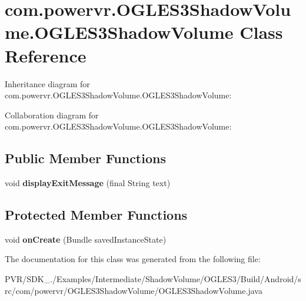\hypertarget{classcom_1_1powervr_1_1_o_g_l_e_s3_shadow_volume_1_1_o_g_l_e_s3_shadow_volume}{\section{com.\+powervr.\+O\+G\+L\+E\+S3\+Shadow\+Volume.\+O\+G\+L\+E\+S3\+Shadow\+Volume Class Reference}
\label{classcom_1_1powervr_1_1_o_g_l_e_s3_shadow_volume_1_1_o_g_l_e_s3_shadow_volume}
}


Inheritance diagram for com.\+powervr.\+O\+G\+L\+E\+S3\+Shadow\+Volume.\+O\+G\+L\+E\+S3\+Shadow\+Volume\+:


Collaboration diagram for com.\+powervr.\+O\+G\+L\+E\+S3\+Shadow\+Volume.\+O\+G\+L\+E\+S3\+Shadow\+Volume\+:
\subsection*{Public Member Functions}
\begin{DoxyCompactItemize}
\item 
\hypertarget{classcom_1_1powervr_1_1_o_g_l_e_s3_shadow_volume_1_1_o_g_l_e_s3_shadow_volume_a7284994bff8fd81f9d6a05ce71ef5eab}{void {\bfseries display\+Exit\+Message} (final String text)}\label{classcom_1_1powervr_1_1_o_g_l_e_s3_shadow_volume_1_1_o_g_l_e_s3_shadow_volume_a7284994bff8fd81f9d6a05ce71ef5eab}

\end{DoxyCompactItemize}
\subsection*{Protected Member Functions}
\begin{DoxyCompactItemize}
\item 
\hypertarget{classcom_1_1powervr_1_1_o_g_l_e_s3_shadow_volume_1_1_o_g_l_e_s3_shadow_volume_afda83d4de9f58fa8dbdd38a34e7bcec1}{void {\bfseries on\+Create} (Bundle saved\+Instance\+State)}\label{classcom_1_1powervr_1_1_o_g_l_e_s3_shadow_volume_1_1_o_g_l_e_s3_shadow_volume_afda83d4de9f58fa8dbdd38a34e7bcec1}

\end{DoxyCompactItemize}


The documentation for this class was generated from the following file\+:\begin{DoxyCompactItemize}
\item 
P\+V\+R/\+S\+D\+K\+\_./\+Examples/\+Intermediate/\+Shadow\+Volume/\+O\+G\+L\+E\+S3/\+Build/\+Android/src/com/powervr/\+O\+G\+L\+E\+S3\+Shadow\+Volume/O\+G\+L\+E\+S3\+Shadow\+Volume.\+java\end{DoxyCompactItemize}
